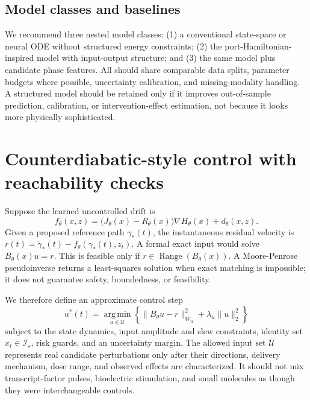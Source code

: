 \documentclass[11pt,a4paper]{article}
\theoremstyle{definition}
\theoremstyle{remark}
\newcommand{\Iset}{\mathcal{I}_{\varepsilon}}
\newcommand{\argmin}{\operatorname*{arg\,min}}
\begin{document}
\subsection{Model classes and baselines}
We recommend three nested model classes: (1) a conventional state-space or neural ODE without structured energy constraints; (2) the port-Hamiltonian-inspired model with input-output structure; and (3) the same model plus candidate phase features. All should share comparable data splits, parameter budgets where possible, uncertainty calibration, and missing-modality handling. A structured model should be retained only if it improves out-of-sample prediction, calibration, or intervention-effect estimation, not because it looks more physically sophisticated.

\section{Counterdiabatic-style control with reachability checks}
Suppose the learned uncontrolled drift is
\begin{equation}
f_\theta(x,z)=\big(J_\theta(x)-R_\theta(x)\big)\nabla H_\theta(x)+d_\theta(x,z).
\end{equation}
Given a proposed reference path $\gamma_*(t)$, the instantaneous residual velocity is $r(t)=\dot\gamma_*(t)-f_\theta(\gamma_*(t),z_t)$. A formal exact input would solve $B_\theta(x)u=r$. This is feasible only if $r\in\operatorname{Range}(B_\theta(x))$. A Moore-Penrose pseudoinverse returns a least-squares solution when exact matching is impossible; it does not guarantee safety, boundedness, or feasibility.

We therefore define an approximate control step
\begin{equation}
u^*(t)=\argmin_{u\in\mathcal{U}}\left\{\|B_\theta u-r\|_{W_u}^{2}+\lambda_u\|u\|_2^2\right\}
\label{eq:control_lsq}
\end{equation}
subject to the state dynamics, input amplitude and slew constraints, identity set $x_t\in\Iset$, risk guards, and an uncertainty margin. The allowed input set $\mathcal{U}$ represents real candidate perturbations only after their directions, delivery mechanism, dose range, and observed effects are characterized. It should not mix transcript-factor pulses, bioelectric stimulation, and small molecules as though they were interchangeable controls.
\end{document}
